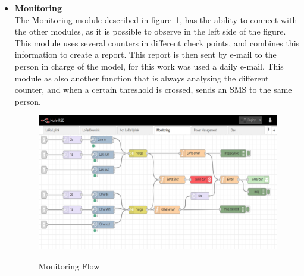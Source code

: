 \begin{itemize}
   \item \textbf{Monitoring} \\
   The Monitoring module described in figure~\ref{fig:Monitoring}, has the ability to connect with the other modules, as it is possible to observe in the left side of the figure. This module uses several counters in different check points, and combines this information to create a report. This report is then sent by e-mail to the person in charge of the model, for this work was used a daily e-mail. This module as also another function that is always analysing the different counter, and when a certain threshold is crossed, sends an SMS to the same person.\newline
 
  \begin{figure}[htbp]
  \centering
  
    {\includegraphics[width=0.9\linewidth]{Chapters/Figures/monitoring.pdf}}
 
  \caption{Monitoring Flow}
  \label{fig:Monitoring}
\end{figure}

\end{itemize}


